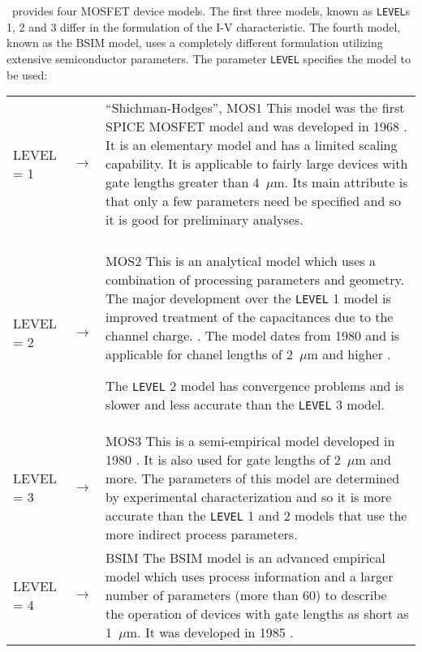 \spice\ provides four MOSFET device models.  The first three models, known as
{\tt LEVEL}s 1, 2 and 3 differ
in  the formulation of the I-V characteristic.  The fourth model, known as
the BSIM model, uses a completely different formulation utilizing extensive
semiconductor parameters.
The parameter {\tt LEVEL} specifies the model to be used:
\\[0.2in]
\noindent\begin{longtable}{p{0.9in}p{0.2in}p{4in}}
         LEVEL = 1& $\rightarrow$ &  ``Shichman-Hodges'', MOS1\newline
                    This model was the first SPICE MOSFET model and
		      was developed
		      in 1968 \cite{shichman:hodges:68}.
		      It is an elementary model and has a limited
		      scaling capability.  It is applicable to fairly large
		      devices with gate lengths greater than 4~$\mu$m.
		      Its main attribute is that only a few parameters need
		      be specified and so it is good for preliminary analyses.\\
		      \\
         LEVEL = 2& $\rightarrow$ &  MOS2\newline
             This is an analytical model which uses a combination of
	     processing parameters and geometry. The major development over
	     the {\tt LEVEL} 1 model is improved treatment of the
	     capacitances due to the channel charge.  
	     \cite{meyer:71,ward:dutton:78,oh:ward:80}.  The model dates
	     from 1980 and is applicable for chanel lengths of 2~$\mu$m
	     and higher \cite{vladimirescu:liu:80}.

             The {\tt LEVEL} 2 model has convergence problems and is slower and
	     less accurate than the {\tt LEVEL} 3 model.\\
         LEVEL = 3& $\rightarrow$ &  MOS3\newline
             This is a semi-empirical model developed in 1980
             \cite{vladimirescu:liu:80}.  It is also
	     used for gate lengths of 2~$\mu$m and more.
	     The parameters of this model are determined by experimental
	     characterization and so it is more accurate than the {\tt LEVEL}
             1 and 2 models that use the more indirect process parameters.
	     \\
         LEVEL = 4& $\rightarrow$ &  BSIM \newline
             The BSIM model is an advanced empirical model which uses process
	     information and a larger number of parameters (more than 60)
	     to describe the operation of devices with gate lengths as short
	     as 1~$\mu$m.  It was developed in 1985 \cite{sheu:scharfetter:87}.
         \end{longtable}


